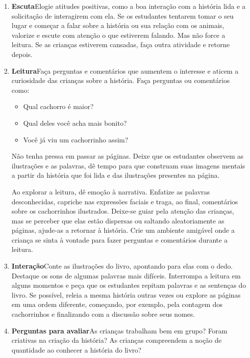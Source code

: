 \documentclass[11pt]{extarticle}
\begin{document}
\begin{enumerate}
\item \textbf{Escuta}\quad Elogie atitudes positivas, como 
a boa interação com a história lida e a solicitação de interagirem com ela. Se os estudantes tentarem 
tomar o seu lugar e começar a falar sobre a história ou sua relação com os animais, valorize e escute com atenção o que estiverem falando. Mas não 
force a leitura. Se as crianças estiverem cansadas, faça outra atividade 
e retorne depois. 

\item \textbf{Leitura}\quad Faça perguntas e comentários que aumentem o 
interesse e aticem a curiosidade das crianças sobre a história. Faça 
perguntas ou comentários como: 

\begin{itemize}
\item Qual cachorro é maior?
\item Qual deles você acha mais bonito?
\item Você já viu um cachorrinho assim?
\end{itemize}

Não tenha pressa em passar as páginas. Deixe que os estudantes 
observem as ilustrações e as palavras, dê tempo para que construam suas imagens 
mentais a partir da história que foi lida e das ilustrações presentes na página. 

Ao explorar a leitura, dê emoção 
à narrativa. Enfatize as palavras desconhecidas,
capriche nas expressões faciais e traga, ao final, comentários sobre os cachorrinhos ilustrados.
Deixe-se guiar pela atenção das crianças, mas se perceber que 
elas estão dispersas ou saltando aleatoriamente as páginas, ajude-as 
a retornar à história. Crie um ambiente amigável onde a criança 
se sinta à vontade para fazer perguntas e comentários durante a leitura.

\item \textbf{Interação}\quad Conte as ilustrações 
do livro, apontando para elas com o dedo. Destaque os sons de algumas 
palavras mais difíceis. Interrompa a leitura em alguns momentos e peça que 
os estudantes repitam palavras e as sentenças do livro. Se possível, 
releia a mesma história outras vezes ou explore as páginas em uma ordem 
diferente, começando, por exemplo, pela contagem dos cachorrinhos e finalizando com a discussão sobre seus nomes. 

\item \textbf{Perguntas para avaliar}\quad As crianças trabalham bem em grupo? Foram criativas na criação da história? As crianças compreendem a noção de quantidade ao conhecer a história do livro?
\end{enumerate}
\end{document}
